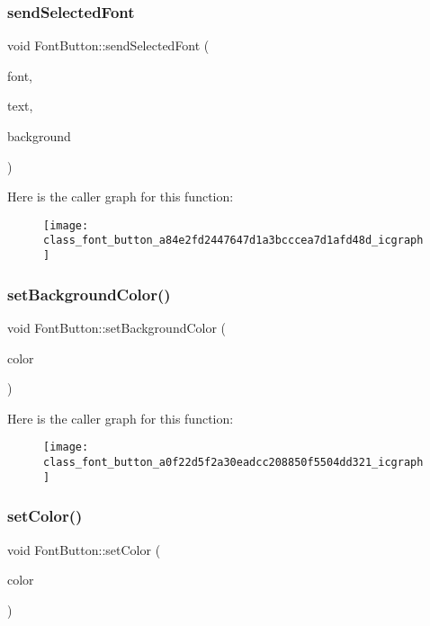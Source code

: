 \subsubsection{send\+Selected\+Font}
{\footnotesize\ttfamily void Font\+Button\+::send\+Selected\+Font (\begin{DoxyParamCaption}\item[{Q\+Font}]{font,  }\item[{Q\+Color}]{text,  }\item[{Q\+Color}]{background }\end{DoxyParamCaption})\hspace{0.3cm}{\ttfamily [signal]}}

Here is the caller graph for this function\+:\nopagebreak
\begin{figure}[H]
\begin{center}
\leavevmode
\texttt{[image: class\_font\_button\_a84e2fd2447647d1a3bcccea7d1afd48d\_icgraph]}
\end{center}
\end{figure}
\mbox{\label{class_font_button_a0f22d5f2a30eadcc208850f5504dd321}} 
\subsubsection{set\+Background\+Color()}
{\footnotesize\ttfamily void Font\+Button\+::set\+Background\+Color (\begin{DoxyParamCaption}\item[{Q\+Color}]{color }\end{DoxyParamCaption})}

Here is the caller graph for this function\+:\nopagebreak
\begin{figure}[H]
\begin{center}
\leavevmode
\texttt{[image: class\_font\_button\_a0f22d5f2a30eadcc208850f5504dd321\_icgraph]}
\end{center}
\end{figure}
\mbox{\label{class_font_button_ac02ddf47305040121eff5578890b2a2b}} 
\subsubsection{set\+Color()}
{\footnotesize\ttfamily void Font\+Button\+::set\+Color (\begin{DoxyParamCaption}\item[{Q\+Color}]{color }\end{DoxyParamCaption})}

